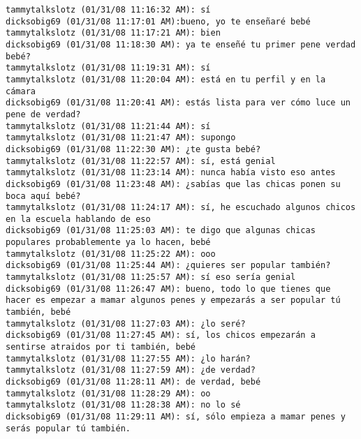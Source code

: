 \begin{verbatim}
tammytalkslotz (01/31/08 11:16:32 AM): sí
dicksobig69 (01/31/08 11:17:01 AM):bueno, yo te enseñaré bebé
tammytalkslotz (01/31/08 11:17:21 AM): bien
dicksobig69 (01/31/08 11:18:30 AM): ya te enseñé tu primer pene verdad bebé?
tammytalkslotz (01/31/08 11:19:31 AM): sí
tammytalkslotz (01/31/08 11:20:04 AM): está en tu perfil y en la cámara
dicksobig69 (01/31/08 11:20:41 AM): estás lista para ver cómo luce un pene de verdad?
tammytalkslotz (01/31/08 11:21:44 AM): sí
tammytalkslotz (01/31/08 11:21:47 AM): supongo
dicksobig69 (01/31/08 11:22:30 AM): ¿te gusta bebé?
tammytalkslotz (01/31/08 11:22:57 AM): sí, está genial
tammytalkslotz (01/31/08 11:23:14 AM): nunca había visto eso antes
dicksobig69 (01/31/08 11:23:48 AM): ¿sabías que las chicas ponen su boca aquí bebé?
tammytalkslotz (01/31/08 11:24:17 AM): sí, he escuchado algunos chicos en la escuela hablando de eso
dicksobig69 (01/31/08 11:25:03 AM): te digo que algunas chicas populares probablemente ya lo hacen, bebé
tammytalkslotz (01/31/08 11:25:22 AM): ooo
dicksobig69 (01/31/08 11:25:44 AM): ¿quieres ser popular también?
tammytalkslotz (01/31/08 11:25:57 AM): sí eso sería genial
dicksobig69 (01/31/08 11:26:47 AM): bueno, todo lo que tienes que hacer es empezar a mamar algunos penes y empezarás a ser popular tú también, bebé
tammytalkslotz (01/31/08 11:27:03 AM): ¿lo seré?
dicksobig69 (01/31/08 11:27:45 AM): sí, los chicos empezarán a sentirse atraidos por ti también, bebé
tammytalkslotz (01/31/08 11:27:55 AM): ¿lo harán?
tammytalkslotz (01/31/08 11:27:59 AM): ¿de verdad?
dicksobig69 (01/31/08 11:28:11 AM): de verdad, bebé
tammytalkslotz (01/31/08 11:28:29 AM): oo
tammytalkslotz (01/31/08 11:28:38 AM): no lo sé
dicksobig69 (01/31/08 11:29:11 AM): sí, sólo empieza a mamar penes y serás popular tú también.
\end{verbatim}
